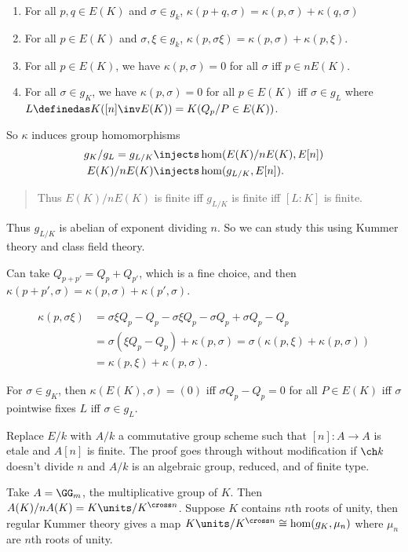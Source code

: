 \begin{enumerate}
\def\labelenumi{\arabic{enumi}.}
\tightlist
\item
  For all \(p, q\in E(K)\) and \(\sigma \in g_k\),
  \(\kappa(p+q, \sigma) = \kappa(p, \sigma) + \kappa(q, \sigma)\)
\item
  For all \(p \in E(K)\) and \(\sigma, \xi \in g_k\),
  \(\kappa(p, \sigma \xi) = \kappa(p, \sigma) + \kappa(p, \xi)\).
\item
  For all \(p\in E(K)\), we have \(\kappa(p, \sigma) = 0\) for all
  \(\sigma\) iff \(p\in nE(K)\).
\item
  For all \(\sigma \in g_K\), we have \(\kappa(p, \sigma) = 0\) for all
  \(p\in E(K)\) iff \(\sigma \in g_L\) where
  \(L\definedas K([n]\inv E(K)) = K(Q_p/P \in E(K))\).
\end{enumerate}

So \(\kappa\) induces group homomorphisms \begin{align*}
  g_K / g_L = g_{L/K} &\injects \hom(E(K) / nE(K), E[n]) \\
  E(K)/ nE(K) &\injects \hom(g_{L/K}, E[n])
  .\end{align*}

\begin{quote}
Thus \(E(K) / n E(K)\) is finite iff \(g_{L/K}\) is finite iff
\([L: K]\) is finite.
\end{quote}

Thus \(g_{L/K}\) is abelian of exponent dividing \(n\). So we can study
this using Kummer theory and class field theory.

\begin{description}
\tightlist
\item[Proof (of 1)]
Can take \(Q_{p + p'} = Q_p + Q_{p'}\), which is a fine choice, and then
\(\kappa(p + p', \sigma) = \kappa(p, \sigma) + \kappa(p', \sigma)\).
\item[Proof (of 2)]
\begin{align*}
  \kappa(p, \sigma \xi) 
  &= \sigma\xi Q_p - Q_p - \sigma \xi Q_p - \sigma Q_p + \sigma Q_p - Q_p \\
  &= \sigma(\xi Q_p - Q_p) + \kappa(p, \sigma) = \sigma(\kappa(p, \xi) + \kappa(p,\sigma)) \\
  &= \kappa(p, \xi) + \kappa(p, \sigma)
  .\end{align*}
\item[Proof (of 3)]
For \(\sigma \in g_K\), then \(\kappa(E(K), \sigma) = (0)\) iff
\(\sigma Q_p - Q_p = 0\) for all \(P \in E(K)\) iff \(\sigma\) pointwise
fixes \(L\) iff \(\sigma \in g_L\).
\item[Exercise]
Replace \(E/k\) with \(A/k\) a commutative group scheme such that
\([n]: A\to A\) is etale and \(A[n]\) is finite. The proof goes through
without modification if \(\ch k\) doesn't divide \(n\) and \(A/k\) is an
algebraic group, reduced, and of finite type.
\item[Exercise]
Take \(A = \GG_m\), the multiplicative group of \(K\). Then
\(A(K) / nA(K) = K\units/K^{\cross n}\). Suppose \(K\) contains \(n\)th
roots of unity, then regular Kummer theory gives a map
\(K\units/K^{\cross n} \cong \hom(g_K, \mu_n)\) where \(\mu_n\) are
\(n\)th roots of unity.
\end{description}


